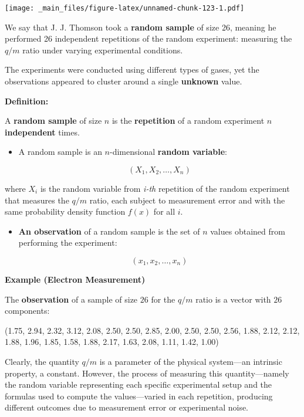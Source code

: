 \documentclass[
]{book}
\begin{document}
\texttt{[image: \_main\_files/figure-latex/unnamed-chunk-123-1.pdf]}

We say that J. J. Thomson took a \textbf{random sample} of size 26, meaning he performed 26 independent repetitions of the random experiment: measuring the \(q/m\) ratio under varying experimental conditions.

The experiments were conducted using different types of gases, yet the observations appeared to cluster around a single \textbf{unknown} value.

\textbf{Definition:}

A \textbf{random sample} of size \(n\) is the \textbf{repetition} of a random experiment \(n\) \textbf{independent} times.

\begin{itemize}
\item
  A random sample is an \(n\)-dimensional \textbf{random variable}:

  \[(X_1, X_2, \dots, X_n)\]
\end{itemize}

where \(X_i\) is the random variable from \emph{i-th} repetition of the random experiment that measures the \(q/m\) ratio, each subject to measurement error and with the same probability density function \(f(x)\) for all \(i\).

\begin{itemize}
\item
  \textbf{An observation} of a random sample is the set of \(n\) values obtained from performing the experiment:

  \[(x_1, x_2, \dots, x_n)\]
\end{itemize}

\textbf{Example (Electron Measurement)}

The \textbf{observation} of a sample of size \(26\) for the \(q/m\) ratio is a vector with \(26\) components:

(1.75, 2.94, 2.32, 3.12, 2.08, 2.50, 2.50, 2.85,
2.00, 2.50, 2.50, 2.56, 1.88, 2.12, 2.12, 1.88,
1.96, 1.85, 1.58, 1.88, 2.17, 1.63, 2.08, 1.11,
1.42, 1.00)

Clearly, the quantity \(q/m\) is a parameter of the physical system---an intrinsic property, a constant. However, the process of measuring this quantity---namely the random variable representing each specific experimental setup and the formulas used to compute the values---varied in each repetition, producing different outcomes due to measurement error or experimental noise.
\end{document}
